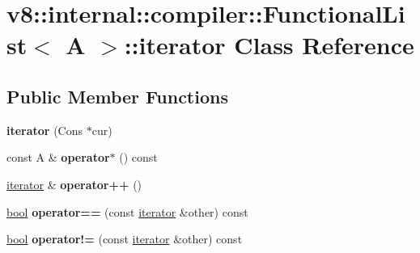\hypertarget{classv8_1_1internal_1_1compiler_1_1FunctionalList_1_1iterator}{}\section{v8\+:\+:internal\+:\+:compiler\+:\+:Functional\+List$<$ A $>$\+:\+:iterator Class Reference}
\label{classv8_1_1internal_1_1compiler_1_1FunctionalList_1_1iterator}
\subsection*{Public Member Functions}
\begin{DoxyCompactItemize}
\item 
\mbox{\label{classv8_1_1internal_1_1compiler_1_1FunctionalList_1_1iterator_ad6af5539de1df797d1462597ed517c75}} 
{\bfseries iterator} (Cons $\ast$cur)
\item 
\mbox{\label{classv8_1_1internal_1_1compiler_1_1FunctionalList_1_1iterator_a1d63198f3ec093c8714c3ff3de714990}} 
const A \& {\bfseries operator$\ast$} () const
\item 
\mbox{\label{classv8_1_1internal_1_1compiler_1_1FunctionalList_1_1iterator_a706b4803d1fcb13bb8925fde07bc640a}} 
\mbox{\hyperlink{classv8_1_1internal_1_1compiler_1_1FunctionalList_1_1iterator}{iterator}} \& {\bfseries operator++} ()
\item 
\mbox{\label{classv8_1_1internal_1_1compiler_1_1FunctionalList_1_1iterator_a37bf315f9ce6936ddd68600679ed9428}} 
\mbox{\hyperlink{classbool}{bool}} {\bfseries operator==} (const \mbox{\hyperlink{classv8_1_1internal_1_1compiler_1_1FunctionalList_1_1iterator}{iterator}} \&other) const
\item 
\mbox{\label{classv8_1_1internal_1_1compiler_1_1FunctionalList_1_1iterator_a2452763d28e46f983e7231e7af25fb80}} 
\mbox{\hyperlink{classbool}{bool}} {\bfseries operator!=} (const \mbox{\hyperlink{classv8_1_1internal_1_1compiler_1_1FunctionalList_1_1iterator}{iterator}} \&other) const
\end{DoxyCompactItemize}



